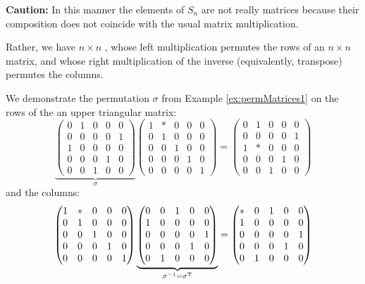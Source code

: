 \documentclass[../UNABRIDGEDalgebraNotesMSRI-UP2016.tex]{subfiles}
\begin{document}
\begin{frame}[c]
\textbf{Caution:} In this manner the elements of $S_n$ are not really matrices because their composition does not coincide with the usual matrix multiplication.

\smallGap
Rather, we have $n\times n$ , whose left multiplication permutes the rows of an $n\times n$ matrix, and whose right multiplication of the inverse (equivalently, transpose) permutes the columns.  
\end{frame}

\begin{frame}
\begin{ex}
We demonstrate the permutation $\sigma$ from Example \ref{ex:permMatrices1} on the rows of the an upper triangular matrix:
\[
\underbrace{\begin{pmatrix}
	0 & 1 & 0 & 0 & 0 \\
	0 & 0 & 0 & 0 & 1 \\
	1 & 0 & 0 & 0 & 0 \\
	0 & 0 & 0 & 1 & 0 \\
	0 & 0 & 1 & 0 & 0
	\end{pmatrix}}_{\sigma}
\begin{pmatrix}
	1 & * & 0 & 0 & 0 \\
	0 & 1 & 0 & 0 & 0 \\
	0 & 0 & 1 & 0 & 0 \\
	0 & 0 & 0 & 1 & 0 \\
	0 & 0 & 0 & 0 & 1
	\end{pmatrix} =
	\begin{pmatrix}
	0 & 1 & 0 & 0 & 0 \\
	0 & 0 & 0 & 0 & 1 \\
	1 & * & 0 & 0 & 0 \\
	0 & 0 & 0 & 1 & 0 \\
	0 & 0 & 1 & 0 & 0
	\end{pmatrix}
\]
and the columns:
\[
\begin{pmatrix}
	1 & * & 0 & 0 & 0 \\
	0 & 1 & 0 & 0 & 0 \\
	0 & 0 & 1 & 0 & 0 \\
	0 & 0 & 0 & 1 & 0 \\
	0 & 0 & 0 & 0 & 1
	\end{pmatrix}
\underbrace{\begin{pmatrix}
	0 & 0 & 1 & 0 & 0 \\
	1 & 0 & 0 & 0 & 0 \\
	0 & 0 & 0 & 0 & 1 \\
	0 & 0 & 0 & 1 & 0 \\
	0 & 1 & 0 & 0 & 0
	\end{pmatrix}}_{\sigma^{-1}=\sigma^{\text{T}}} =
\begin{pmatrix}
* & 0 & 1 & 0 & 0 \\
1 & 0 & 0 & 0 & 0 \\
0 & 0 & 0 & 0 & 1 \\
0 & 0 & 0 & 1 & 0 \\
0 & 1 & 0 & 0 & 0
\end{pmatrix}	
\]
\end{ex}
\end{frame}
\end{document}
